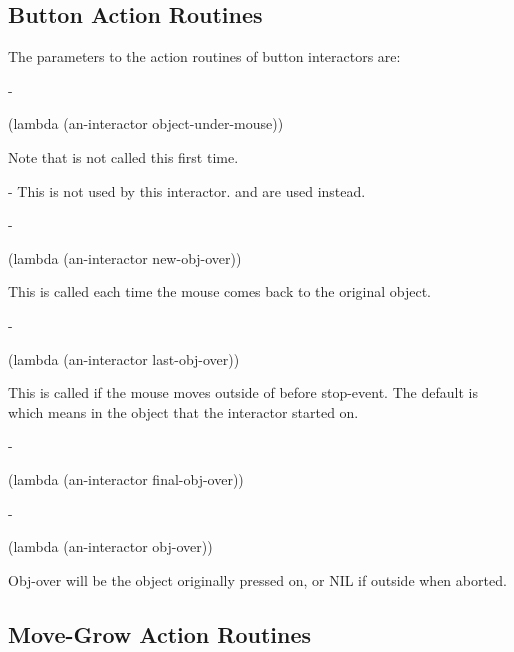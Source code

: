 \subsection{Button Action Routines}
\label{buttoncustomaction}

The parameters to the action routines of button interactors are:

\begin{description}

 -
\begin{programinlist}
(lambda (an-interactor object-under-mouse))
\end{programinlist}
Note that  is not called this first time.



 -
This is not used by this interactor.
 and  are used instead.



 -
\begin{programinlist}
(lambda (an-interactor new-obj-over))
\end{programinlist}
This is called each time the mouse comes back to the original object.



 -
\begin{programinlist}
(lambda (an-interactor last-obj-over))
\end{programinlist}
This is called if the mouse moves outside of
 before stop-event.  The default  is
 which means in the object that the interactor started on.



 -
\begin{programinlist}
(lambda (an-interactor final-obj-over))
\end{programinlist}



 -
\begin{programinlist}
(lambda (an-interactor obj-over))
\end{programinlist}
Obj-over will be the object originally pressed on, or NIL if outside
when aborted.


\end{description}


\subsection{Move-Grow Action Routines}
\label{movegrowcustomaction}

